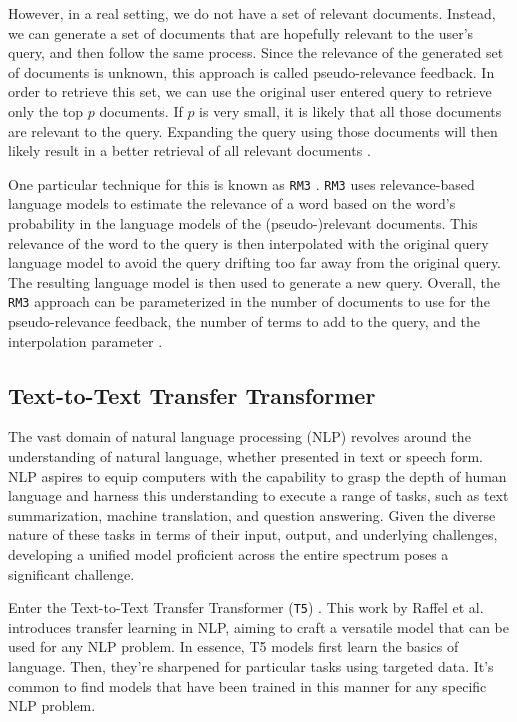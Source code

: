 \documentclass[sigconf]{acmart}
\begin{document}
However, in a real setting, we do not have a set of relevant documents. Instead, we can generate a set of documents that are hopefully relevant to the user's query, and then follow the same process. Since the relevance of the generated set of documents is unknown, this approach is called pseudo-relevance feedback. In order to retrieve this set, we can use the original user entered query to retrieve only the top $p$ documents. If $p$ is very small, it is likely that all those documents are relevant to the query. Expanding the query using those documents will then likely result in a better retrieval of all relevant documents \cite{vaidyanathan2015query}.

One particular technique for this is known as \texttt{RM3} \cite{abdul2004umass}. \texttt{RM3} uses relevance-based language models \cite{lavrenko2017relevance} to estimate the relevance of a word based on the word's probability in the language models of the (pseudo-)relevant documents. This relevance of the word to the query is then interpolated with the original query language model to avoid the query drifting too far away from the original query. The resulting language model is then used to generate a new query. Overall, the \texttt{RM3} approach can be parameterized in the number of documents to use for the pseudo-relevance feedback, the number of terms to add to the query, and the interpolation parameter \cite{abdul2004umass,lavrenko2017relevance,chen2022pseudo}.


\subsection*{Text-to-Text Transfer Transformer}\label{sec:t5}
The vast domain of natural language processing (NLP) revolves around the understanding of natural language, whether presented in text or speech form. NLP aspires to equip computers with the capability to grasp the depth of human language and harness this understanding to execute a range of tasks, such as text summarization, machine translation, and question answering. Given the diverse nature of these tasks in terms of their input, output, and underlying challenges, developing a unified model proficient across the entire spectrum poses a significant challenge.

Enter the Text-to-Text Transfer Transformer (\texttt{T5}) \cite{raffel2020exploring}. This work by Raffel et al. introduces transfer learning in NLP, aiming to craft a versatile model that can be used for any NLP problem. In essence, T5 models first learn the basics of language. Then, they're sharpened for particular tasks using targeted data. It's common to find models that have been trained in this manner for any specific NLP problem.
\end{document}
